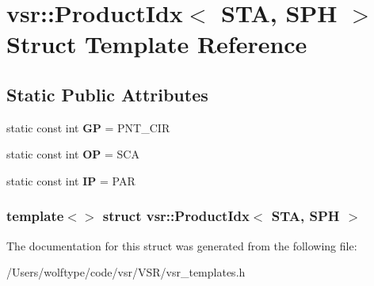 \hypertarget{structvsr_1_1_product_idx_3_01_s_t_a_00_01_s_p_h_01_4}{\section{vsr\-:\-:Product\-Idx$<$ S\-T\-A, S\-P\-H $>$ Struct Template Reference}
\label{structvsr_1_1_product_idx_3_01_s_t_a_00_01_s_p_h_01_4}
}
\subsection*{Static Public Attributes}
\begin{DoxyCompactItemize}
\item 
\hypertarget{structvsr_1_1_product_idx_3_01_s_t_a_00_01_s_p_h_01_4_ab73ebfdad6e415a9455424194102a95f}{static const int {\bfseries G\-P} = P\-N\-T\-\_\-\-C\-I\-R}\label{structvsr_1_1_product_idx_3_01_s_t_a_00_01_s_p_h_01_4_ab73ebfdad6e415a9455424194102a95f}

\item 
\hypertarget{structvsr_1_1_product_idx_3_01_s_t_a_00_01_s_p_h_01_4_a06b2b6328dab55764bd3ff5aa1c7cbd5}{static const int {\bfseries O\-P} = S\-C\-A}\label{structvsr_1_1_product_idx_3_01_s_t_a_00_01_s_p_h_01_4_a06b2b6328dab55764bd3ff5aa1c7cbd5}

\item 
\hypertarget{structvsr_1_1_product_idx_3_01_s_t_a_00_01_s_p_h_01_4_a6cce8cf66d15bca373ac3496005e7011}{static const int {\bfseries I\-P} = P\-A\-R}\label{structvsr_1_1_product_idx_3_01_s_t_a_00_01_s_p_h_01_4_a6cce8cf66d15bca373ac3496005e7011}

\end{DoxyCompactItemize}
\subsubsection*{template$<$$>$ struct vsr\-::\-Product\-Idx$<$ S\-T\-A, S\-P\-H $>$}



The documentation for this struct was generated from the following file\-:\begin{DoxyCompactItemize}
\item 
/\-Users/wolftype/code/vsr/\-V\-S\-R/vsr\-\_\-templates.\-h\end{DoxyCompactItemize}
